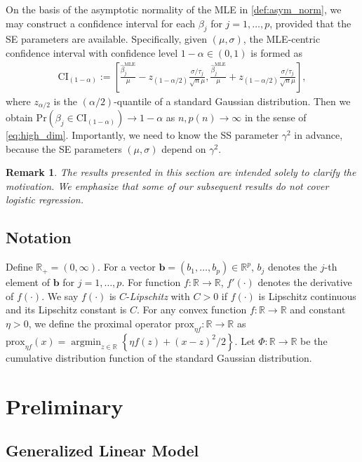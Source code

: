 \documentclass[12pt,reqno]{amsart}
\newtheorem{remark}{Remark}%
\newcommand{\cbr}[1]{\left\{#1\right\}}
\newcommand{\R}{\mathbb{R}}
\newcommand{\prox}{\mathrm{prox}}
\DeclareMathOperator*{\argmin}{arg min}
\newcommand{\cc}{\color{black}}
\renewcommand{\hat}{\widehat}
\def\bb{\bm{b}}
\begin{document}
On the {\cc basis} of the asymptotic normality of the MLE in \eqref{def:asym_norm}, we may construct a confidence interval for each $\beta_j$ for $j=1,\ldots,p$, provided that the SE parameters are available.
Specifically, given $(\mu,\sigma)$, the MLE-centric confidence interval with confidence level $1 - \alpha \in (0,1)$ is formed as
\begin{align}
    \mathrm{CI}_{(1-\alpha)} := \left[ \frac{\hat{\beta}^{\mathrm{MLE}}_j}{\mu} - z_{(1-\alpha/2)} \frac{\sigma { /\tau_j}}{\sqrt{n}\mu},  \frac{\hat{\beta}^{\mathrm{MLE}}_j}{\mu} + z_{(1-\alpha/2)} \frac{\sigma { /\tau_j}}{\sqrt{n}\mu}\right], \label{def:CI}
\end{align}
where $z_{\alpha/2}$ is the $(\alpha/2)$-quantile of a standard Gaussian distribution. 
Then we obtain $\mathrm{Pr}(\beta_j \in \mathrm{CI}_{(1-\alpha)}) \to 1 - \alpha$ as $n,p(n) \to \infty$ in the sense of \eqref{eq:high_dim}.
Importantly, we need to know the SS parameter $\gamma^2$ in advance, because the SE parameters $(\mu, \sigma)$ depend on $\gamma^2$.
{\cc
\begin{remark}
    The results presented in this section are intended solely to clarify the motivation. We emphasize that some of our subsequent results do not cover logistic regression.
\end{remark}}

\subsection{Notation}
Define $\R_+=(0,\infty)$. 
For a vector $\bb = (b_1,\dots,b_p)\in \R^p$, $b_j$ denotes {\cc the} $j$-th element of $\bb$ for $j=1,\dots,p$. 
For function $f: \R \to \R$, $f'(\cdot)$ denotes the derivative of $f(\cdot)$.
We say $f(\cdot)$ is $C$-\textit{Lipschitz} with $C > 0$ if $f(\cdot)$ is Lipschitz continuous and its Lipschitz constant is $C$.
For any convex function $f:\R\to\R$ and constant $\eta>0$, we define the proximal operator $\prox_{\eta f}:\R\to\R$ as
$\prox_{\eta f}(x)=\argmin_{z\in\R}\cbr{\eta f(z)+(x-z)^2/2}$. 
{\cc Let $\Phi:\R\to\R$ be the cumulative distribution function of the standard Gaussian distribution.}
    

\section{Preliminary}


\subsection{Generalized Linear Model}
\end{document}
